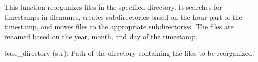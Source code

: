 \documentclass[letterpaper,10pt,english]{sphinxmanual}
\begin{document}

\begin{fulllineitems}
\label{\detokenize{akhdefo_functions:akhdefo_functions.Akhdefo_Tools.move_files}}
\pysigstartsignatures
{}
\pysigstopsignatures
\sphinxAtStartPar
This function reorganizes files in the specified directory. 
It searches for timestamps in filenames, creates subdirectories based on the hour part of the timestamp,
and moves files to the appropriate subdirectories. The files are renamed based on the year, month, and day of the timestamp.
\begin{description}
\sphinxAtStartPar
base\_directory (str): Path of the directory containing the files to be reorganized.

\end{description}

\end{fulllineitems}

\end{document}
